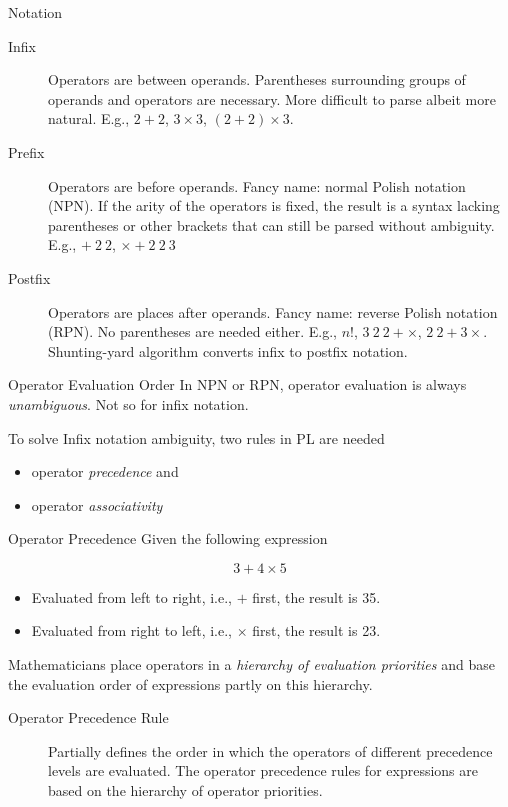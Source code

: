 \documentclass[presentation]{beamer}
\begin{document}
\begin{frame}[label={sec:orgheadline3}]{Notation}
\begin{description}
\item[{Infix}] Operators are between operands.  Parentheses surrounding
groups of operands and operators are necessary.  More
difficult to parse albeit more natural.  E.g., \(2 + 2\),
\(3\times3\), \((2 + 2) \times 3\).
\item[{Prefix}] Operators are before operands.  Fancy name: normal
Polish notation (NPN).  If the arity of the operators is
fixed, the result is a syntax lacking parentheses or other
brackets that can still be parsed without ambiguity.  E.g.,
\(+ \ 2\ 2\), \(\times +2\ 2\ 3\)
\item[{Postfix}] Operators are places after operands.  Fancy name:
reverse Polish notation (RPN).  No parentheses are needed
either.  E.g., \(n!\), \(3\ 2\ 2+\times\), \(2\ 2 + 3\times\).
Shunting-yard algorithm converts infix to postfix notation.
\end{description}
\end{frame}

\begin{frame}[label={sec:orgheadline4}]{Operator Evaluation Order}
In NPN or RPN, operator evaluation is always \emph{unambiguous}.  Not so
for infix notation.

To solve Infix notation ambiguity, two rules in PL are needed
\begin{itemize}
\item operator \emph{precedence} and
\item operator \emph{associativity}
\end{itemize}
\end{frame}

\begin{frame}[label={sec:orgheadline5}]{Operator Precedence}
Given the following expression

\[3 + 4 \times 5\]

\begin{itemize}
\item Evaluated from left to right, i.e., \(+\) first, the result
is 35.
\item Evaluated from right to left, i.e., \(\times\) first, the result
is 23.
\end{itemize}


Mathematicians place operators in a \emph{hierarchy of evaluation
priorities} and base the evaluation order of expressions partly on
this hierarchy.

\begin{description}
\item[{Operator Precedence Rule}] Partially defines the order in which
the operators of different precedence levels are evaluated.
The operator precedence rules for expressions are based on the
hierarchy of operator priorities.
\end{description}
\end{frame}
\end{document}

